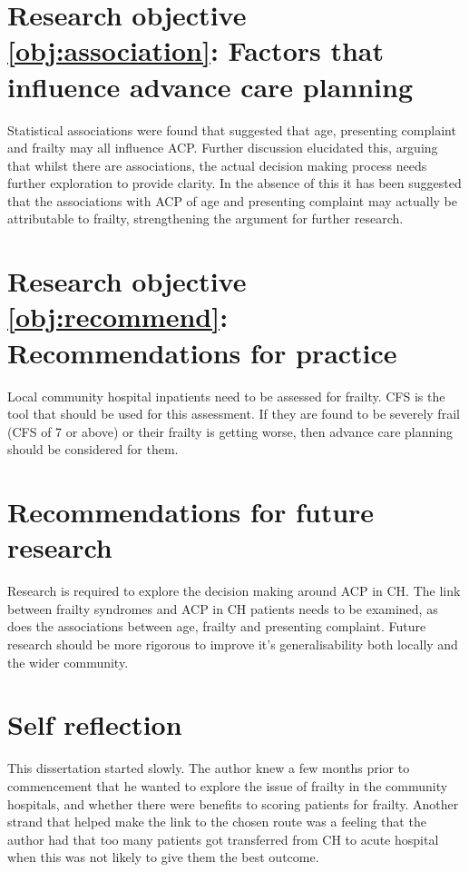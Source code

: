 \documentclass
[
	12pt,
	a4paper,
	oneside,
]{report}
\begin{document}
\section{Research objective \ref{obj:association}: Factors that influence
advance care planning}

Statistical associations were found that suggested that age, presenting
complaint and frailty may all influence ACP. Further discussion elucidated
this, arguing that whilst there are associations, the actual decision
making process needs further exploration to provide clarity. In the absence of
this it has been suggested that the associations with ACP of age and 
presenting complaint may actually be attributable to frailty, strengthening
the argument for further research.

\section{Research objective \ref{obj:recommend}: Recommendations for practice}

Local community hospital inpatients need to be assessed for frailty. CFS is 
the tool that should be used for this assessment. If they are
found to be severely frail (CFS of 7 or above) or their frailty is getting
worse, then advance care planning
should be considered for them.

\section{Recommendations for future research}

Research is required to explore the decision making around ACP in CH. The
link between frailty syndromes and ACP in CH patients needs to be examined, 
as does the associations between age, frailty and presenting complaint.
Future research should be more rigorous to improve it's generalisability
both locally and the wider community.

\section{Self reflection}

This dissertation started slowly. The author knew a few months prior to 
commencement that he wanted to explore the issue of frailty in the community
hospitals, and whether there were benefits to scoring patients for frailty.
Another strand that helped make the link to the chosen route was a feeling
that the author had that too many patients got transferred from CH to acute
hospital when this was not likely to give them the best outcome.
\end{document}
